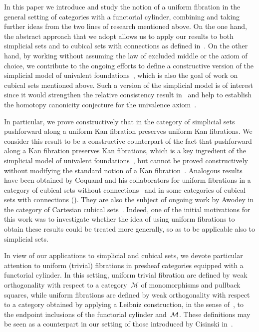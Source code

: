 \documentclass[reqno,10pt,a4paper,oneside,draft]{amsart}
\begin{document}
In this paper we introduce and study the notion of a uniform fibration in the general setting of categories with a functorial cylinder, combining and taking further ideas from the two lines of research mentioned above.
On the one hand, the abstract approach that we adopt allows us to apply our results to both simplicial sets and to cubical sets with connections as defined in~\cite{cohen-et-al:cubicaltt,coquand-variation}.
On the other hand, by working without assuming the law of excluded middle or the axiom of choice, we contribute to the ongoing efforts to define a constructive version of the simplicial model of univalent foundations~\cite{voevodsky-simplicial-model}, which is also the goal of work on cubical sets mentioned above.
Such a version of the simplicial model is of interest since it would strengthen the relative consistency result in~\cite[Theorem~3.4.3]{voevodsky-simplicial-model} and help to establish the homotopy canonicity conjecture for the univalence axiom~\cite[Conjecture~1]{voevodsky:uf}.

In particular, we prove constructively that in the category of simplicial sets pushforward along a uniform Kan fibration preserves uniform Kan fibrations.
We consider this result to be a constructive counterpart of the fact that pushforward along a Kan fibration preserves Kan fibrations, which is a key ingredient of the simplicial model of univalent foundations~\cite[Lemma~2.3.1]{voevodsky-simplicial-model}, but cannot be proved constructively without modifying the standard notion of a Kan fibration~\cite{coquand-non-constructivity-kan}.
Analogous results have been obtained by Coquand and his collaborators for uniform fibrations in a category of cubical sets without connections~\cite{coquand-cubical-sets,huber-thesis} and in some categories of cubical sets with connections (\cf \cite{cohen-et-al:cubicaltt,coquand-face,coquand-variation}).
They are also the subject of ongoing work by Awodey in the category of Cartesian cubical sets~\cite{awodey-cubical}.
Indeed, one of the initial motivations for this work was to investigate whether the idea of using uniform fibrations to obtain these results could be treated more generally, so as to be applicable also to simplicial sets.

In view of our applications to simplicial and cubical sets, we devote particular attention to uniform (trivial) fibrations in presheaf categories equipped with a functorial cylinder.
In this setting, uniform trivial fibration are defined by weak orthogonality with respect to a category~$\mathcal{M}$ of monomorphisms and pullback squares, while uniform fibrations are defined by weak orthogonality with respect to a category obtained by applying a Leibniz construction, in the sense of~\cite{riehl-verity:reedy}, to the endpoint inclusions of the functorial cylinder and~$\cal{M}$.
These definitions may be seen as a counterpart in our setting of those introduced by Cisinski in~\cite{cisinski-asterisque}.
\end{document}
